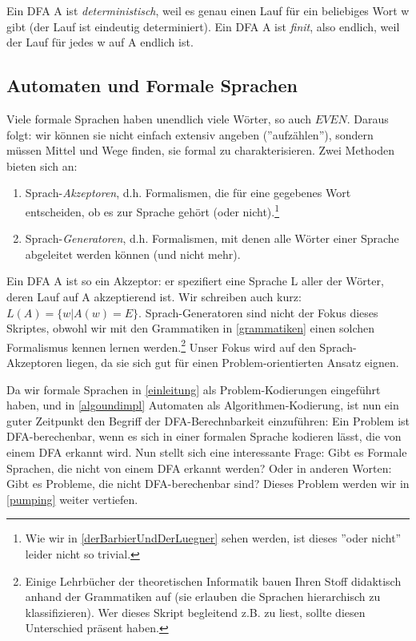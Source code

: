 Ein DFA A ist \emph{deterministisch}, weil es genau einen Lauf
für ein beliebiges Wort w gibt (der Lauf ist eindeutig determiniert).
Ein DFA A ist \emph{finit}, also endlich, weil der Lauf für jedes w auf A endlich ist.

\subsection{Automaten und Formale Sprachen}

Viele formale Sprachen haben unendlich viele Wörter,
so auch $EVEN$.
Daraus folgt: wir können sie nicht einfach extensiv angeben (''aufzählen''),
sondern müssen Mittel und Wege finden, sie formal zu charakterisieren.
Zwei Methoden bieten sich an:
\begin{enumerate}
    \item Sprach-\emph{Akzeptoren}, d.h. Formalismen,
        die für eine gegebenes Wort entscheiden,
        ob es zur Sprache gehört (oder nicht).\footnote{
            Wie wir in \autoref{derBarbierUndDerLuegner} sehen werden,
            ist dieses ''oder nicht'' leider nicht so trivial.}

    \item Sprach-\emph{Generatoren}, d.h. Formalismen,
        mit denen alle Wörter einer Sprache abgeleitet werden können
        (und nicht mehr).
\end{enumerate}


Ein DFA A ist so ein Akzeptor:
er spezifiert eine Sprache L aller der Wörter,
deren Lauf auf A akzeptierend ist.
Wir schreiben auch kurz: $L(A) = \{w|A(w) = E\}$.
Sprach-Generatoren sind nicht der Fokus dieses Skriptes, obwohl wir mit den Grammatiken
in \autoref{grammatiken} einen solchen Formalismus kennen lernen werden.\footnote{
Einige Lehrbücher der theoretischen Informatik bauen Ihren Stoff didaktisch anhand der Grammatiken
auf (sie erlauben die Sprachen hierarchisch zu klassifizieren).
Wer dieses Skript begleitend z.B. zu \cite{schoening} liest,
sollte diesen Unterschied präsent haben.}
Unser Fokus wird auf den Sprach-Akzeptoren liegen,
da sie sich gut für einen Problem-orientierten Ansatz eignen.

Da wir formale Sprachen in \autoref{einleitung} als Problem-Kodierungen eingeführt haben,
und in \autoref{algoundimpl} Automaten als Algorithmen-Kodierung,
ist nun ein guter Zeitpunkt den Begriff der DFA-Berechnbarkeit einzuführen:
Ein Problem ist DFA-berechenbar,
wenn es sich in einer formalen Sprache kodieren lässt,
die von einem DFA erkannt wird.
Nun stellt sich eine interessante Frage:
Gibt es Formale Sprachen, die nicht von einem DFA erkannt werden?
Oder in anderen Worten: Gibt es Probleme, die nicht DFA-berechenbar sind?
Dieses Problem werden wir in \autoref{pumping} weiter vertiefen.

